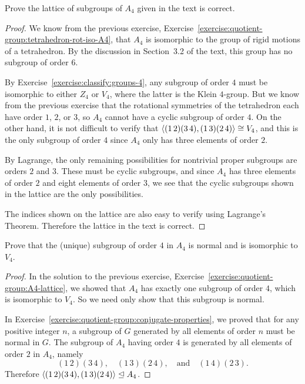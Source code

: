 \label{exercise:quotient-group:A4-lattice}
Prove the lattice of subgroups of $A_4$ given in the text is correct.
\begin{proof}
  We know from the previous exercise,
  Exercise~\ref{exercise:quotient-group:tetrahedron-rot-iso-A4}, that
  $A_4$ is isomorphic to the group of rigid motions of a
  tetrahedron. By the discussion in Section~3.2 of the text, this
  group has no subgroup of order $6$.

  By Exercise~\ref{exercise:classify:groups-4}, any subgroup of order
  $4$ must be isomorphic to either $Z_4$ or $V_4$, where the latter is
  the Klein $4$-group. But we know from the previous exercise that the
  rotational symmetries of the tetrahedron each have order $1$, $2$,
  or $3$, so $A_4$ cannot have a cyclic subgroup of order $4$. On the
  other hand, it is not difficult to verify that
  $\langle{(1\,2)(3\,4), (1\,3)(2\,4)}\rangle\cong V_4$, and this is the only
  subgroup of order $4$ since $A_4$ only has three elements of order
  $2$.

  By Lagrange, the only remaining possibilities for nontrivial proper
  subgroups are orders $2$ and $3$. These must be cyclic subgroups,
  and since $A_4$ has three elements of order $2$ and eight elements
  of order $3$, we see that the cyclic subgroups shown in the lattice
  are the only possibilities.

  The indices shown on the lattice are also easy to verify using
  Lagrange's Theorem. Therefore the lattice in the text is correct.
\end{proof}

\label{exercise:quotient-group:A4-normal-subgroup-order-4}
Prove that the (unique) subgroup of order $4$ in $A_4$ is normal and
is isomorphic to $V_4$.
\begin{proof}
  In the solution to the previous exercise,
  Exercise~\ref{exercise:quotient-group:A4-lattice}, we showed that
  $A_4$ has exactly one subgroup of order $4$, which is isomorphic to
  $V_4$. So we need only show that this subgroup is normal.

  In Exercise~\ref{exercise:quotient-group:conjugate-properties}, we
  proved that for any positive integer $n$, a subgroup of $G$
  generated by all elements of order $n$ must be normal in $G$. The
  subgroup of $A_4$ having order $4$ is generated by all elements of
  order $2$ in $A_4$, namely
  \begin{equation*}
    (1\,2)(3\,4), \quad
    (1\,3)(2\,4), \quad\text{and}\quad
    (1\,4)(2\,3).
  \end{equation*}
  Therefore $\langle{(1\,2)(3\,4), (1\,3)(2\,4)}\rangle\trianglelefteq A_4$.
\end{proof}

